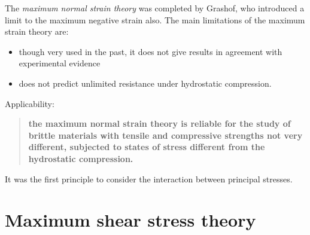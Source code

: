 The \textit{maximum normal strain theory} was completed by Grashof, who introduced a limit to the maximum negative strain also. The main limitations of the maximum strain theory are:
\begin{itemize}
  \item though very used in the past, it does not give results in agreement with experimental evidence
  \item does not predict unlimited resistance under hydrostatic compression.
\end{itemize}
Applicability:
\begin{quotation}
  \textbf{the maximum normal strain theory is reliable for the study of brittle materials with tensile and compressive strengths not very different, subjected to states of stress different from the hydrostatic compression.}
\end{quotation}
It was the first principle to consider the interaction between principal stresses.
\section{Maximum shear stress theory}

